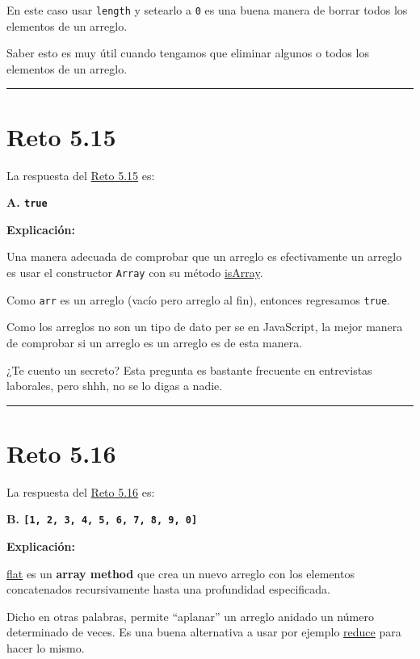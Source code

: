 \documentclass[
  letterpaper,
  DIV=11,
  numbers=noendperiod]{scrreprt}
\begin{document}
En este caso usar \texttt{length} y setearlo a \texttt{0} es una buena
manera de borrar todos los elementos de un arreglo.

Saber esto es muy útil cuando tengamos que eliminar algunos o todos los
elementos de un arreglo.

\begin{center}\rule{0.5\linewidth}{0.5pt}\end{center}

\section{Reto 5.15}\label{sec-sol-cap5-reto15}

La respuesta del \hyperref[sec-cap5-reto15]{Reto 5.15} es:

\textbf{A. \texttt{true}}

\textbf{Explicación:}

Una manera adecuada de comprobar que un arreglo es efectivamente un
arreglo es usar el constructor \texttt{Array} con su método
\hyperref[glos-isarray]{isArray}.

Como \texttt{arr} es un arreglo (vacío pero arreglo al fin), entonces
regresamos \texttt{true}.

Como los arreglos no son un tipo de dato per se en JavaScript, la mejor
manera de comprobar si un arreglo es un arreglo es de esta manera.

¿Te cuento un secreto? Esta pregunta es bastante frecuente en
entrevistas laborales, pero shhh, no se lo digas a nadie.

\begin{center}\rule{0.5\linewidth}{0.5pt}\end{center}

\section{Reto 5.16}\label{sec-sol-cap5-reto16}

La respuesta del \hyperref[sec-cap5-reto16]{Reto 5.16} es:

\textbf{B. \texttt{{[}1,\ 2,\ 3,\ 4,\ 5,\ 6,\ 7,\ 8,\ 9,\ 0{]}}}

\textbf{Explicación:}

\hyperref[glos-flat]{flat} es un \textbf{array method} que crea un nuevo
arreglo con los elementos concatenados recursivamente hasta una
profundidad especificada.

Dicho en otras palabras, permite ``aplanar'' un arreglo anidado un
número determinado de veces. Es una buena alternativa a usar por ejemplo
\hyperref[glos-reduce]{reduce} para hacer lo mismo.
\end{document}
